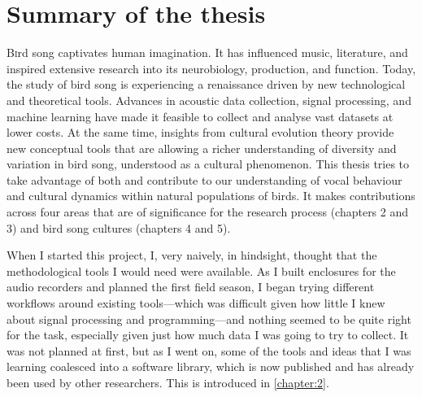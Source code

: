 
\section{Summary of the thesis}
\lettrine[lines=2]Bird song captivates human imagination. It has influenced music, literature, and inspired extensive research into its neurobiology, production, and function. Today, the study of bird song is experiencing a renaissance driven by new technological and theoretical tools. Advances in acoustic data collection, signal processing, and machine learning have made it feasible to collect and analyse vast datasets at lower costs. At the same time, insights from cultural evolution theory provide new conceptual tools that are allowing a richer understanding of diversity and variation in bird song, understood as a cultural phenomenon. This thesis tries to take advantage of both and contribute to our understanding of vocal behaviour and cultural dynamics within natural populations of birds. It makes contributions across four areas that are of significance for the research process (chapters 2 and 3) and bird song cultures (chapters 4 and 5).

When I started this project, I, very naively, in hindsight, thought that the methodological tools I would need were available. As I built enclosures for the audio recorders and planned the first field season, I began trying different workflows around existing tools---which was difficult given how little I knew about signal processing and programming---and nothing seemed to be quite right for the task, especially given just how much data I was going to try to collect. It was not planned at first, but as I went on, some of the tools and ideas that I was learning coalesced into a software library, which is now published and has already been used by other researchers. This is introduced in \autoref{chapter:2}. 

